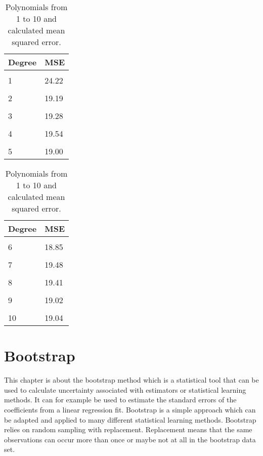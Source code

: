 \begin{table}[htbp]
	\centering
	\begin{subtable}[t]{2in}
		\centering
		\begin{tabular}{ p{2.5cm} p{1.5cm}  }
			\textbf{Degree} & \textbf{MSE} \\
			\hline 
			\\
			1 & 24.22 \\\hline
			\\
			2 & 19.19 \\\hline
			\\
			3 & 19.28 \\\hline
			\\
			4 & 19.54  \\\hline
			\\
			5 & 19.00  \\\hline
		\end{tabular}
		\label{table:mse_validation}
	\end{subtable}
	\quad 
	\begin{subtable}[t]{2in}
		\centering
		\begin{tabular}{ p{2.5cm} p{1.5cm}  }
			\textbf{Degree} & \textbf{MSE} \\
			\hline 
			\\
			6 & 18.85 \\\hline
			\\
			7 & 19.48  \\\hline
			\\
			8 & 19.41  \\\hline
			\\
			9 & 19.02  \\\hline
			\\
			10 & 19.04  \\\hline
		\end{tabular}
		\label{table:mse_cross}
	\end{subtable}
	\caption{Polynomials from 1 to 10 and calculated mean squared error.}\label{table:kfold_polynomials_mse}
\end{table}


\section{Bootstrap}
This chapter is about the bootstrap method which is a statistical tool that can be used to calculate uncertainty associated with estimators or statistical learning methods. It can for example be used to estimate the standard errors of the coefficients from a linear regression fit. Bootstrap is a simple approach which can be adapted and applied to many different statistical learning methods. Bootstrap relies on random sampling with replacement. Replacement means that the same observations can occur more than once or maybe not at all in the bootstrap data set. 


